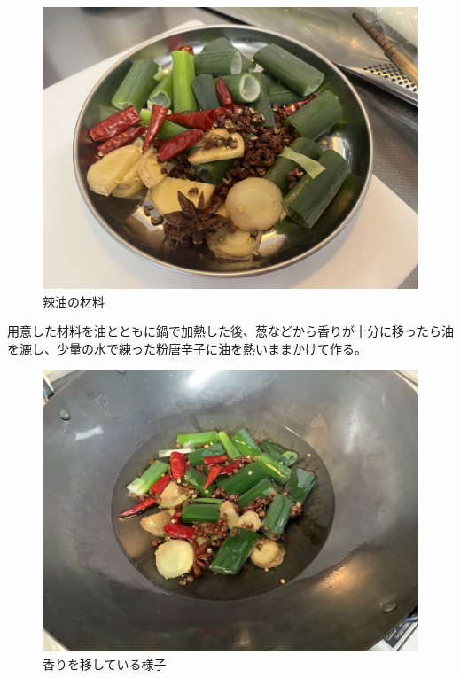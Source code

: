 \documentclass[a4paper,10pt,xelatex,ja=standard,twocolumn]{bxjsarticle}
\begin{document}
\begin{figure}[h]
  \caption{辣油の材料}
  \label{rayu}
  \begin{center}
    \includegraphics[width=\linewidth]{IMG_4078.jpg}
  \end{center}
\end{figure}

用意した材料を油とともに鍋で加熱した後、葱などから香りが十分に移ったら油を漉し、少量の水で練った粉唐辛子に油を熱いままかけて作る。

\begin{figure}[h]
  \caption{香りを移している様子}
  \label{rayu2}
  \begin{center}
    \includegraphics[width=\linewidth]{IMG_4094.jpg}
  \end{center}
\end{figure}
\end{document}
